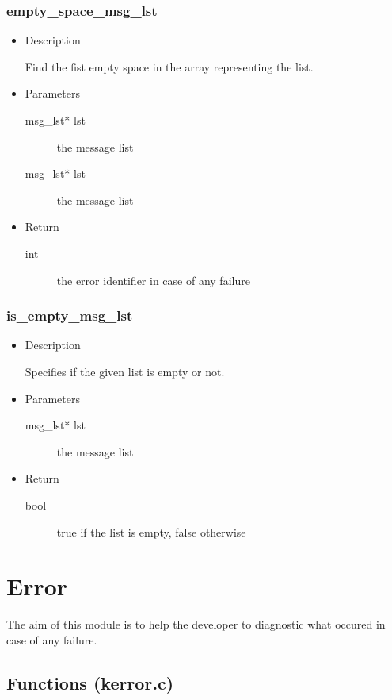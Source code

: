 \subsubsection{empty\_space\_msg\_lst}
\begin{itemize}
  \item{Description}

	 Find the fist empty space in the array representing the list.
  \item{Parameters}
	 \begin{description}
		\item[msg\_lst* lst] the message list
		\item[msg\_lst* lst] the message list
	 \end{description}
  \item{Return}
	 \begin{description}
		\item[int] the error identifier in case of any failure
	 \end{description}
\end{itemize}


\subsubsection{is\_empty\_msg\_lst}
\begin{itemize}
  \item{Description}

	 Specifies if the given list is empty or not.
  \item{Parameters}
	 \begin{description}
		\item[msg\_lst* lst] the message list
	 \end{description}
  \item{Return}
	 \begin{description}
		\item[bool] true if the list is empty, false otherwise
	 \end{description}
\end{itemize}


\section{Error}

The aim of this module is to help the developer to diagnostic what occured in
case of any failure.
\subsection{Functions (kerror.c)}

